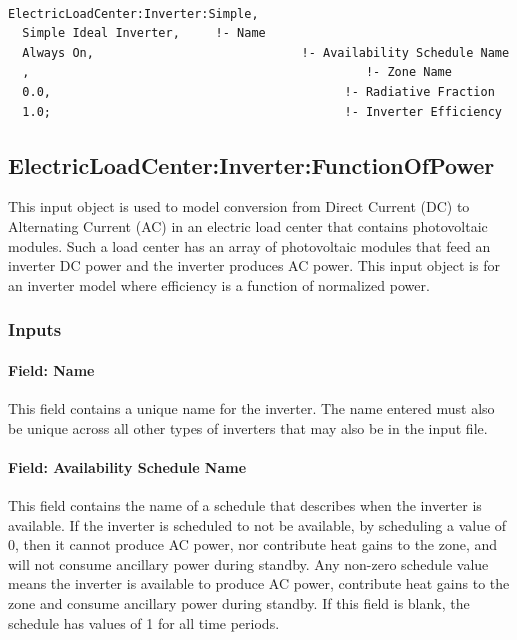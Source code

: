 \begin{lstlisting}

ElectricLoadCenter:Inverter:Simple,
  Simple Ideal Inverter,     !- Name
  Always On,                             !- Availability Schedule Name
  ,                                               !- Zone Name
  0.0,                                         !- Radiative Fraction
  1.0;                                         !- Inverter Efficiency
\end{lstlisting}

\subsection{ElectricLoadCenter:Inverter:FunctionOfPower}\label{electricloadcenterinverterfunctionofpower}

This input object is used to model conversion from Direct Current (DC) to Alternating Current (AC) in an electric load center that contains photovoltaic modules. Such a load center has an array of photovoltaic modules that feed an inverter DC power and the inverter produces AC power. This input object is for an inverter model where efficiency is a function of normalized power.

\subsubsection{Inputs}\label{inputs-4-009}

\paragraph{Field: Name}\label{field-name-3-009}

This field contains a unique name for the inverter. The name entered must also be unique across all other types of inverters that may also be in the input file.

\paragraph{Field: Availability Schedule Name}\label{field-availability-schedule-name-2-001}

This field contains the name of a schedule that describes when the inverter is available. If the inverter is scheduled to not be available, by scheduling a value of 0, then it cannot produce AC power, nor contribute heat gains to the zone, and will not consume ancillary power during standby. Any non-zero schedule value means the inverter is available to produce AC power, contribute heat gains to the zone and consume ancillary power during standby. If this field is blank, the schedule has values of 1 for all time periods.

